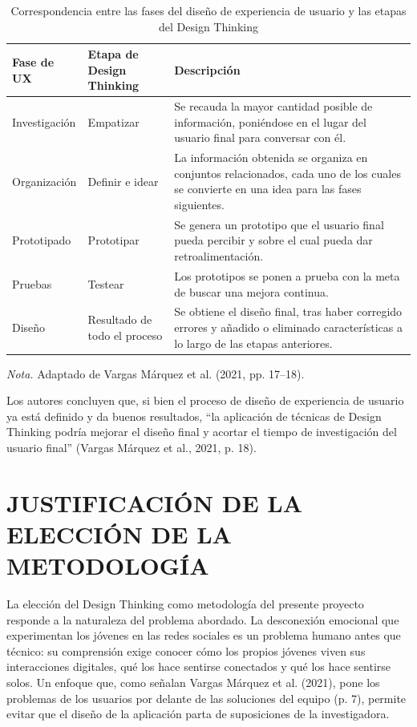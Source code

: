 \begin{table}[htbp]
\caption{Correspondencia entre las fases del diseño de experiencia de usuario y las etapas del Design Thinking}
\label{tab:dt_ux}
\begin{tabular}{
  >{\raggedright\arraybackslash}p{}
  >{\raggedright\arraybackslash}p{}
  >{\raggedright\arraybackslash}p{}
}
\toprule
\textbf{Fase de UX} & \textbf{Etapa de Design Thinking} & \textbf{Descripción} \\
\midrule
Investigación & Empatizar & Se recauda la mayor cantidad posible de información, poniéndose en el lugar del usuario final para conversar con él. \\[4pt]
Organización & Definir e idear & La información obtenida se organiza en conjuntos relacionados, cada uno de los cuales se convierte en una idea para las fases siguientes. \\[4pt]
Prototipado & Prototipar & Se genera un prototipo que el usuario final pueda percibir y sobre el cual pueda dar retroalimentación. \\[4pt]
Pruebas & Testear & Los prototipos se ponen a prueba con la meta de buscar una mejora continua. \\[4pt]
Diseño & Resultado de todo el proceso & Se obtiene el diseño final, tras haber corregido errores y añadido o eliminado características a lo largo de las etapas anteriores. \\
\bottomrule
\end{tabular}

\vspace{4pt}
\noindent\textit{Nota.} Adaptado de Vargas Márquez et al. (2021, pp. 17--18).
\end{table}

Los autores concluyen que, si bien el proceso de diseño de experiencia de usuario ya está definido y da buenos resultados, ``la aplicación de técnicas de Design Thinking podría mejorar el diseño final y acortar el tiempo de investigación del usuario final'' (Vargas Márquez et al., 2021, p. 18).

\section{JUSTIFICACIÓN DE LA ELECCIÓN DE LA METODOLOGÍA}
La elección del Design Thinking como metodología del presente proyecto responde a la naturaleza del problema abordado. La desconexión emocional que experimentan los jóvenes en las redes sociales es un problema humano antes que técnico: su comprensión exige conocer cómo los propios jóvenes viven sus interacciones digitales, qué los hace sentirse conectados y qué los hace sentirse solos. Un enfoque que, como señalan Vargas Márquez et al. (2021), pone los problemas de los usuarios por delante de las soluciones del equipo (p. 7), permite evitar que el diseño de la aplicación parta de suposiciones de la investigadora.

